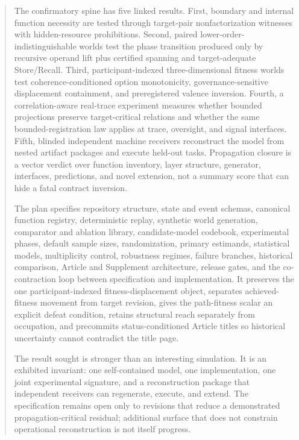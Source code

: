 \documentclass[11pt]{article}
\begin{document}
\begin{abstract}
The confirmatory spine has five linked results. First, boundary and internal function necessity are tested through target-pair nonfactorization witnesses with hidden-resource prohibitions. Second, paired lower-order-indistinguishable worlds test the phase transition produced only by recursive operand lift plus certified spanning and target-adequate Store/Recall. Third, participant-indexed three-dimensional fitness worlds test coherence-conditioned option monotonicity, governance-sensitive displacement containment, and preregistered valence inversion. Fourth, a correlation-aware real-trace experiment measures whether bounded projections preserve target-critical relations and whether the same bounded-registration law applies at trace, oversight, and signal interfaces. Fifth, blinded independent machine receivers reconstruct the model from nested artifact packages and execute held-out tasks. Propagation closure is a vector verdict over function inventory, layer structure, generator, interfaces, predictions, and novel extension, not a summary score that can hide a fatal contract inversion.

The plan specifies repository structure, state and event schemas, canonical function registry, deterministic replay, synthetic world generation, comparator and ablation library, candidate-model codebook, experimental phases, default sample sizes, randomization, primary estimands, statistical models, multiplicity control, robustness regimes, failure branches, historical comparison, Article and Supplement architecture, release gates, and the co-contraction loop between specification and implementation. It preserves the one participant-indexed fitness-displacement object, separates achieved-fitness movement from target revision, gives the path-fitness scalar an explicit defeat condition, retains structural reach separately from occupation, and precommits status-conditioned Article titles so historical uncertainty cannot contradict the title page.

The result sought is stronger than an interesting simulation. It is an exhibited invariant: one self-contained model, one implementation, one joint experimental signature, and a reconstruction package that independent receivers can regenerate, execute, and extend. The specification remains open only to revisions that reduce a demonstrated propagation-critical residual; additional surface that does not constrain operational reconstruction is not itself progress.
\end{abstract}
\end{document}
